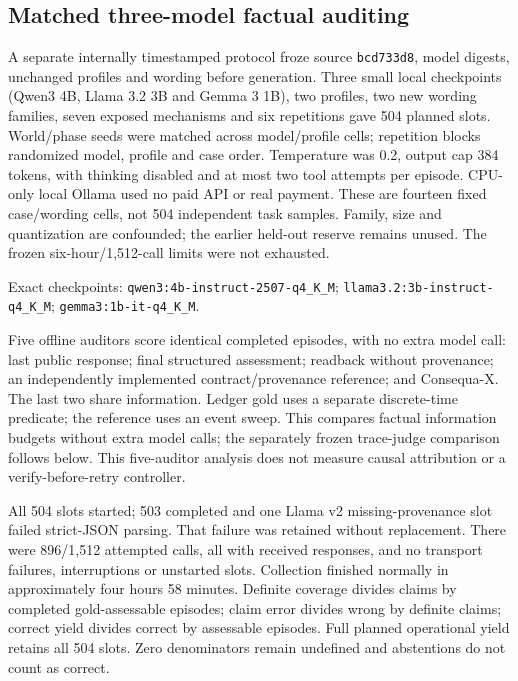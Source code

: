 \documentclass[conference]{IEEEtran}
\begin{document}
\subsection{Matched three-model factual auditing}
A separate internally timestamped protocol froze source \texttt{bcd733d8},
model digests, unchanged profiles and wording before generation. Three small
local checkpoints (Qwen3 4B, Llama 3.2 3B and Gemma 3 1B), two profiles,
two new wording families,
seven exposed mechanisms and six repetitions gave 504 planned slots.
World/phase seeds were matched across model/profile cells; repetition blocks
randomized model, profile and case order. Temperature was 0.2, output cap 384
tokens, with thinking disabled and at most two tool attempts per episode.
CPU-only local Ollama used no paid API or real payment. These are fourteen
fixed case/wording cells, not 504 independent task samples. Family, size and
quantization are confounded; the earlier held-out reserve remains unused.
The frozen six-hour/1,512-call limits were not exhausted.

\begingroup\raggedright\footnotesize
Exact checkpoints: \nolinkurl{qwen3:4b-instruct-2507-q4_K_M};
\nolinkurl{llama3.2:3b-instruct-q4_K_M};
\nolinkurl{gemma3:1b-it-q4_K_M}.\par\endgroup

Five offline auditors score identical completed episodes, with no extra model
call: last public response; final structured assessment; readback without
provenance; an independently implemented contract/provenance reference; and
Consequa-X. The last two share information. Ledger gold uses a separate
discrete-time predicate; the reference uses an event sweep. This compares
factual information budgets without extra model calls; the separately frozen
trace-judge comparison follows below. This five-auditor analysis does not
measure causal attribution or a verify-before-retry controller.

All 504 slots started; 503 completed and one Llama v2 missing-provenance slot
failed strict-JSON parsing. That failure was retained without replacement.
There were 896/1,512 attempted calls, all with received responses, and no
transport failures, interruptions or unstarted slots. Collection finished
normally in approximately four hours 58 minutes. Definite coverage divides
claims by completed gold-assessable episodes; claim error divides wrong by
definite claims; correct yield divides correct by assessable episodes. Full
planned operational yield retains all 504 slots. Zero denominators remain
undefined and abstentions do not count as correct.
\end{document}
